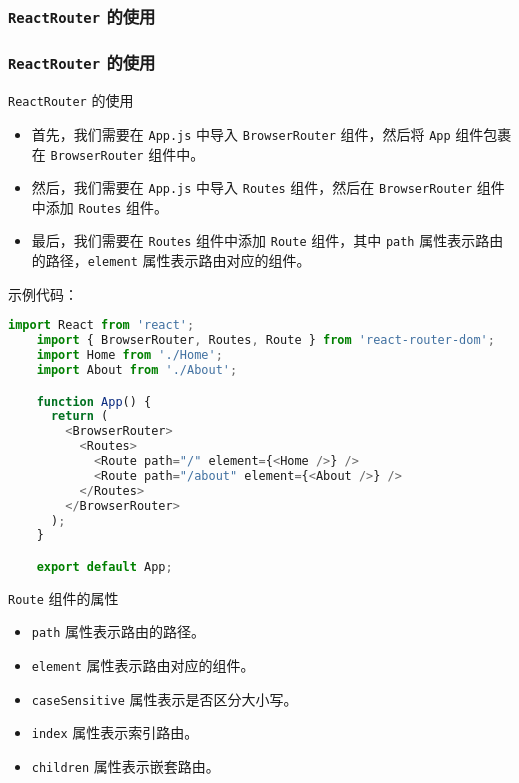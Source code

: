 \documentclass{beamer}
\begin{document}
\subsubsection{\texttt{ReactRouter} 的使用}
\begin{frame}
  \frametitle{\texttt{ReactRouter} 的使用}

  \begin{block}{\texttt{ReactRouter} 的使用}
    \begin{itemize}
      \item 首先，我们需要在 \texttt{App.js} 中导入 \texttt{BrowserRouter} 组件，然后将 \texttt{App} 组件包裹在 \texttt{BrowserRouter} 组件中。
      \item 然后，我们需要在 \texttt{App.js} 中导入 \texttt{Routes} 组件，然后在 \texttt{BrowserRouter} 组件中添加 \texttt{Routes} 组件。
      \item 最后，我们需要在 \texttt{Routes} 组件中添加 \texttt{Route} 组件，其中 \texttt{path} 属性表示路由的路径，\texttt{element} 属性表示路由对应的组件。
    \end{itemize}
  \end{block}

  \framebreak

  示例代码：

  \begin{lstlisting}[language=JavaScript]
    import React from 'react';
    import { BrowserRouter, Routes, Route } from 'react-router-dom';
    import Home from './Home';
    import About from './About';

    function App() {
      return (
        <BrowserRouter>
          <Routes>
            <Route path="/" element={<Home />} />
            <Route path="/about" element={<About />} />
          </Routes>
        </BrowserRouter>
      );
    }

    export default App;
  \end{lstlisting}

  \framebreak

  \begin{alertblock}{\texttt{Route} 组件的属性}
    \begin{itemize}
      \item \texttt{path} 属性表示路由的路径。
      \item \texttt{element} 属性表示路由对应的组件。
      \item \texttt{caseSensitive} 属性表示是否区分大小写。
      \item \texttt{index} 属性表示索引路由。
      \item \texttt{children} 属性表示嵌套路由。
    \end{itemize}
  \end{alertblock}


\end{frame}
\end{document}
